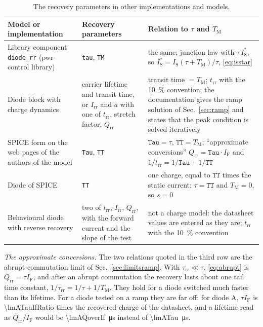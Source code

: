 \documentclass[10pt,a4paper]{scrartcl}
\newcommand{\IF}{I_\mathrm{F}}
\newcommand{\Irr}{I_\mathrm{rr}}
\newcommand{\Qrr}{Q_\mathrm{rr}}
\newcommand{\trr}{t_\mathrm{rr}}
\newcommand{\taurr}{\tau_\mathrm{rr}}
\newcommand{\TM}{T_\mathrm{M}}
\newcommand{\IS}{I_\mathrm{S}}
\begin{document}
\begin{table}[htb]
\centering\small
\caption{The recovery parameters in other implementations and models.}
\label{tab:others}
\begin{tabular}{@{}p{4.6cm}p{4.2cm}p{7.2cm}@{}}
\toprule
Model or implementation & Recovery parameters & Relation to $\tau$ and $\TM$ \\
\midrule
Library component \texttt{diode\_rr} (pwr-control library) & \texttt{tau}, \texttt{TM} & the same; junction law with $\tau\,\IS^{*}$, so $\IS^{*} = \IS(\tau+\TM)/\tau$, \eqref{eq:isstar} \\
\addlinespace
Diode block with charge dynamics \cite{mathworks} & carrier lifetime and transit time, or $\Irr$ and $a$ with one of $\trr$, stretch factor, $\Qrr$ & transit time $= \TM$; $\trr$ with the \SI{10}{\percent} convention; the documentation gives the ramp solution of Sec.~\ref{sec:ramp} and states that the peak condition is solved iteratively \\
\addlinespace
SPICE form on the web pages of the authors of the model \cite{pemodels} & \texttt{Tau}, \texttt{TT} & $\texttt{Tau} = \tau$, $\texttt{TT} = \TM$; ``approximate conversions'' $\Qrr = \texttt{Tau}\cdot\IF$ and $1/\trr = 1/\texttt{Tau} + 1/\texttt{TT}$ \\
\addlinespace
Diode of SPICE & \texttt{TT} & one charge, equal to $\texttt{TT}$ times the static current: $\tau = \texttt{TT}$ and $\TM = 0$, so $s = 0$ \\
\addlinespace
Behavioural diode with reverse recovery \cite{plecs} & two of $\trr$, $\Irr$, $\Qrr$, with the forward current and the slope of the test & not a charge model: the datasheet values are entered as they are; $\trr$ with the \SI{10}{\percent} convention \\
\bottomrule
\end{tabular}
\end{table}

\emph{The approximate conversions.} The two relations quoted in the third row are the abrupt-commutation limit of Sec.~\ref{sec:limitsramp}. With $\taurr \ll \tau$, \eqref{eq:abrupt} is $\Qrr = \tau\IF$, and after an abrupt commutation the recovery lasts about one tail time constant, $1/\taurr = 1/\tau + 1/\TM$. They hold for a diode switched much faster than its lifetime. For a diode tested on a ramp they are far off: for diode A, $\tau\IF$ is \num{\lmATauIfRatio} times the recovered charge of the datasheet, and a lifetime read as $\Qrr/\IF$ would be \SI{\lmAQoverIf}{\micro\second} instead of \SI{\lmATau}{\micro\second}.
\end{document}
